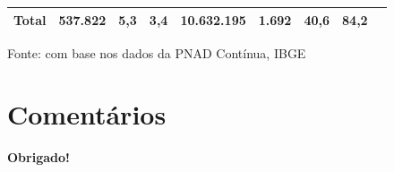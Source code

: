 \documentclass[8pt]{beamer}
\begin{document}
\begin{frame}[label=amzcod2dig]{}
\begin{table}[H]
{\begin{threeparttable}
\begin{tabular}{l*{8}{r}}
\hline
\textbf{Total}               &     537.822&         5,3&         3,4&  10.632.195&       1.692&        40,6&        84,2\\
\bottomrule
\end{tabular}
\begin{tablenotes}
\item \scriptsize{Fonte: com base nos dados da PNAD Contínua, IBGE}
\end{tablenotes}
\end{threeparttable}
}
\end{table}

\end{frame}


\section{Comentários}

\frame
{
\begin{center}
	\vfill
	\textbf{Obrigado!}
	\\
	\vfill     
\end{center}
}
\end{document}
